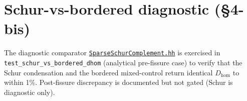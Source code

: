 \section{Schur-vs-bordered diagnostic (\S4-bis)}

The diagnostic comparator
\href{run:src/numerics/SparseSchurComplement.hh}{%
\texttt{SparseSchurComplement.hh}} is exercised in
\texttt{test\_schur\_vs\_bordered\_dhom} (analytical pre-fissure case)
to verify that the Schur condensation and the bordered mixed-control
return identical \(D_{\mathrm{hom}}\) to within 1\%. Post-fissure
discrepancy is documented but not gated (Schur is diagnostic only).
